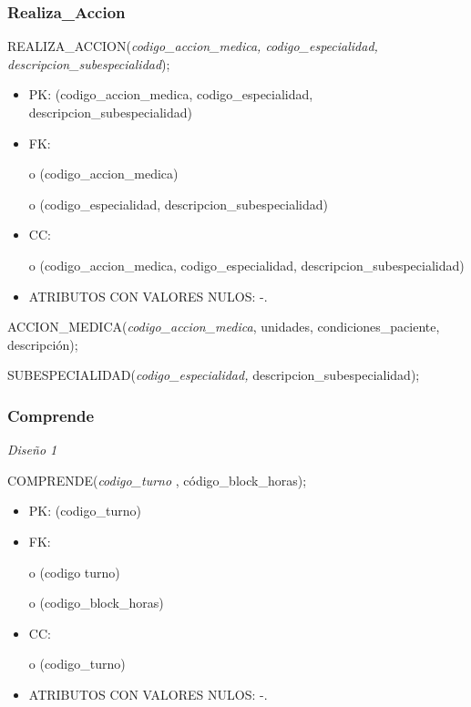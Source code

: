 \documentclass[a4paper,11pt]{article}
\begin{document}
\subsubsection{\textbf{Realiza\_Accion}}

REALIZA\_ACCION(\emph{codigo\_accion\_medica, codigo\_especialidad, descripcion\_subespecialidad});

\begin{itemize}
\item PK: (codigo\_accion\_medica, codigo\_especialidad, descripcion\_subespecialidad)

\item FK: 

o (codigo\_accion\_medica)

o (codigo\_especialidad, descripcion\_subespecialidad)

\item CC:

o (codigo\_accion\_medica, codigo\_especialidad, descripcion\_subespecialidad)

\item ATRIBUTOS CON VALORES NULOS:  -.
\end{itemize}

ACCION\_MEDICA(\emph{codigo\_accion\_medica}, unidades, condiciones\_paciente, 
descripción);

SUBESPECIALIDAD(\emph{codigo\_especialidad, }descripcion\_subespecialidad);\label{HToc293405849}

\subsubsection{\textbf{Comprende}}

\textit{Diseño 1}

COMPRENDE(\emph{codigo\_turno} , código\_block\_horas);

\begin{itemize}
\item PK: (codigo\_turno)

\item FK: 

o (codigo turno)

o (codigo\_block\_horas)

\item CC:

o (codigo\_turno)

\item ATRIBUTOS CON VALORES NULOS:  -.
\end{itemize}
\end{document}
